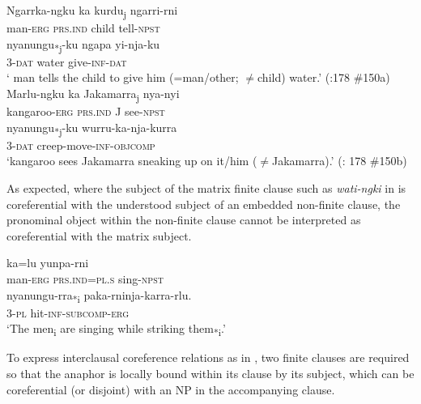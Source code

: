\documentclass[output=paper]{../langscibook}
\begin{document}
\ea%
    \label{ex:laughren:37}
\ea
\label{ex:laughren:37a}
\gll Ngarrka-ngku ka  kurdu\textsubscript{j} {ngarri-rni} \\
    man-\textsc{erg}  \textsc{prs.ind}  child  tell-\textsc{npst}\\

\gll    nyanungu\textsubscript{*j}-ku  ngapa  yi-nja-ku\\
    3-\textsc{dat}  water  give-\textsc{inf-dat}\\
\glt ` man tells the child to give him (=man/other; ${\neq}$child) water.' (\citealt{Simpson1991}:178 \#150a)\\

\ex
\label{ex:laughren:37b}
\gll Marlu-ngku  ka  Jakamarra\textsubscript{j} nya-nyi\\
    kangaroo-\textsc{erg}  \textsc{prs.ind}  J  see-\textsc{npst}\\

    \gll  nyanungu\textsubscript{*j}-ku  wurru-ka-nja-kurra\\
   3-\textsc{dat}  creep-move-\textsc{inf-objcomp}\\
\glt `kangaroo sees Jakamarra sneaking up on it/him (${\neq}$Jakamarra).' (\citealt{Simpson1991}: 178 \#150b)
\z
\z


As expected, where the subject of the matrix finite clause such as \textit{wati-ngki} in  is coreferential with the understood subject of an embedded non-finite clause, the pronominal object within the non-finite clause cannot be interpreted as coreferential with the matrix subject.

\ea%
    \label{ex:laughren:38}
 ka=lu  yunpa-rni\\
  man-\textsc{erg}  \textsc{prs.ind=pl.s}  sing-\textsc{npst}\\

\gll  nyanungu-rra\textsubscript{*i}  paka-rninja-karra-rlu.\\
  \textsc{3-pl}  hit-\textsc{inf-subcomp-erg}\\

\glt `The men\textsubscript{i} are singing while striking them\textsubscript{*i}.'
\z

To express interclausal coreference relations as in , two finite clauses are required so that the anaphor is locally bound within its clause by its subject, which can be coreferential (or disjoint) with an NP in the accompanying clause.
\end{document}
